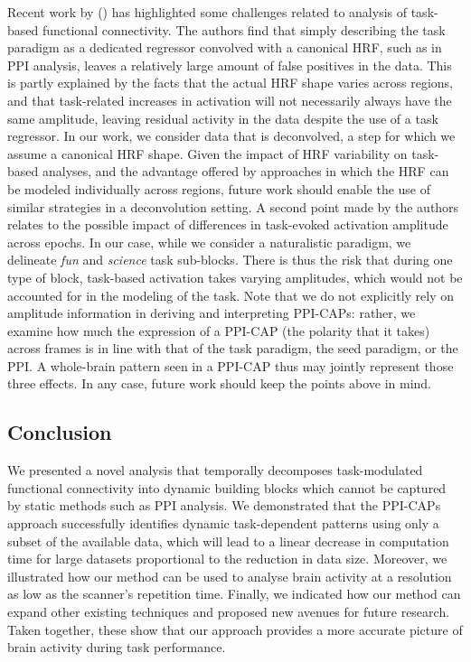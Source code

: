 Recent work by \citeauthor{Cole2019a}(\citeyear{Cole2019a}) has highlighted some challenges related to analysis of task-based functional connectivity. The authors find that simply describing the task paradigm as a dedicated regressor convolved with a canonical HRF, such as in PPI analysis, leaves a relatively large amount of false positives in the data. This is partly explained by the facts that the actual HRF shape varies across regions, and that task-related increases in activation will not necessarily always have the same amplitude, leaving residual activity in the data despite the use of a task regressor. In our work, we consider data that is deconvolved, a step for which we assume a canonical HRF shape. Given the impact of HRF variability on task-based analyses, and the advantage offered by approaches in which the HRF can be modeled individually across regions, future work should enable the use of similar strategies in a deconvolution setting. A second point made by the authors relates to the possible impact of differences in task-evoked activation amplitude across epochs. In our case, while we consider a naturalistic paradigm, we delineate \textit{fun} and \textit{science} task sub-blocks. There is thus the risk that during one type of block, task-based activation takes varying amplitudes, which would not be accounted for in the modeling of the task.
Note that we do not explicitly rely on amplitude information in deriving and interpreting PPI-CAPs: rather, we examine how much the expression of a PPI-CAP (the polarity that it takes) across frames is in line with that of the task paradigm, the seed paradigm, or the PPI. A whole-brain pattern seen in a PPI-CAP thus may jointly represent those three effects. In any case, future work should keep the points above in mind.

\subsection*{Conclusion}

We presented a novel analysis that temporally decomposes task-modulated functional connectivity into dynamic building blocks which cannot be captured by static methods such as PPI analysis. We demonstrated that the PPI-CAPs approach successfully identifies dynamic task-dependent patterns using only a subset of the available data, which will lead to a linear decrease in computation time for large datasets proportional to the reduction in data size. Moreover, we illustrated how our method can be used to analyse brain activity at a resolution as low as the scanner's repetition time. Finally, we indicated how our method can expand other existing techniques and proposed new avenues for future research. Taken together, these show that our approach provides a more accurate picture of brain activity during task performance.

